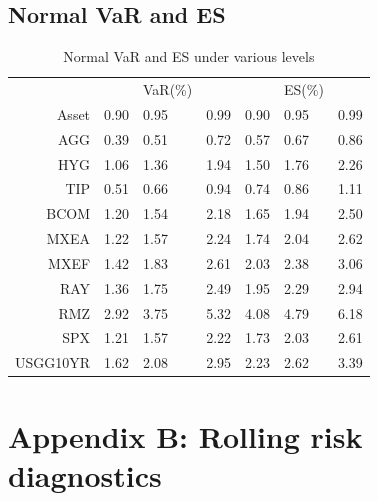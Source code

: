 \documentclass[11pt]{article}
\begin{document}
\subsection{Normal VaR and ES}

\begin{table}[H]
\centering 
\begin{tabular}{ | r || p{1cm} p{1cm} p{1cm} || p{1cm} p{1cm} p{1cm} | } 
 \hline
 & & VaR(\%) &&& ES(\%) & \\
Asset& 0.90 & 0.95 & 0.99 & 0.90 & 0.95 & 0.99 \\
  \hline \hline
AGG & 0.39 & 0.51 & 0.72 & 0.57 & 0.67 & 0.86\\ 
HYG & 1.06 & 1.36 & 1.94 & 1.50 & 1.76 & 2.26\\ 
TIP & 0.51 & 0.66 & 0.94 & 0.74 & 0.86 & 1.11\\ 
BCOM & 1.20 & 1.54 & 2.18 & 1.65 & 1.94 & 2.50\\ 
MXEA & 1.22 & 1.57 & 2.24 & 1.74 & 2.04 & 2.62\\ 
MXEF & 1.42 & 1.83 & 2.61 & 2.03 & 2.38 & 3.06\\ 
RAY & 1.36 & 1.75 & 2.49 & 1.95 & 2.29 & 2.94\\ 
RMZ & 2.92 & 3.75 & 5.32 & 4.08 & 4.79 & 6.18\\ 
SPX & 1.21 & 1.57 & 2.22 & 1.73 & 2.03 & 2.61\\ 
USGG10YR & 1.62 & 2.08 & 2.95 & 2.23 & 2.62 & 3.39\\
 \hline
\end{tabular}
\caption{Normal VaR and ES under various levels}
\label{table:VaRESNormal}
\end{table}



\section{Appendix B: Rolling risk diagnostics} \label{App:AppendixB}
\end{document}
